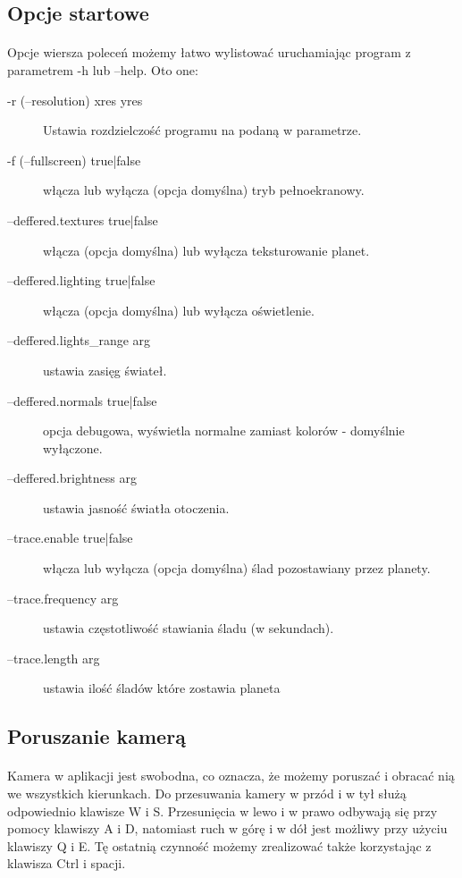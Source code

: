 \subsection{Opcje startowe}\label{sub:uruchamianie programu}
\paragraph{}
Opcje wiersza poleceń możemy łatwo wylistować uruchamiając program z parametrem -h lub --help. Oto one:

\begin{description}
\item[-r (--resolution) xres yres] Ustawia rozdzielczość programu na podaną w parametrze.
\item[-f (--fullscreen) {true|false}] włącza lub wyłącza (opcja domyślna) tryb pełnoekranowy.
\item[--deffered.textures {true|false}] włącza (opcja domyślna) lub wyłącza teksturowanie planet.
\item[--deffered.lighting {true|false}] włącza (opcja domyślna) lub wyłącza oświetlenie.
\item[--deffered.lights\_range arg] ustawia zasięg świateł.
\item[--deffered.normals {true|false}] opcja debugowa, wyświetla normalne zamiast kolorów - domyślnie wyłączone.
\item[--deffered.brightness arg] ustawia jasność światła otoczenia.
\item[--trace.enable {true|false}] włącza lub wyłącza (opcja domyślna) ślad pozostawiany przez planety.
\item[--trace.frequency arg] ustawia częstotliwość stawiania śladu (w sekundach).
\item[--trace.length arg] ustawia ilość śladów które zostawia planeta
\end{description}

\subsection{Poruszanie kamerą}\label{sub:poruszanie kamerą}
\paragraph{}
Kamera w aplikacji jest swobodna, co oznacza, że możemy poruszać i obracać nią we wszystkich kierunkach. Do przesuwania kamery w przód i w tył służą odpowiednio klawisze W i S. Przesunięcia w lewo i w prawo odbywają się przy pomocy klawiszy A i D, natomiast ruch w górę i w dół jest możliwy przy użyciu klawiszy Q i E. Tę ostatnią czynność możemy zrealizować także korzystając z klawisza Ctrl i spacji.
